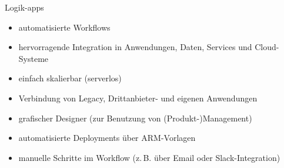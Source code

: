 \begin{flashcard}[]{Logik-apps}
  \begin{itemize}
    \item automatisierte Workflows
    \item hervorragende Integration in Anwendungen, Daten, Services und Cloud-Systeme
    \item einfach skalierbar (serverlos)
    \item Verbindung von Legacy, Drittanbieter- und eigenen Anwendungen
    \item grafischer Designer (zur Benutzung von (Produkt-)Management)
    \item automatisierte Deployments über ARM-Vorlagen
    \item manuelle Schritte im Workflow (z.\,B. über Email oder Slack-Integration)
  \end{itemize}
\end{flashcard}
